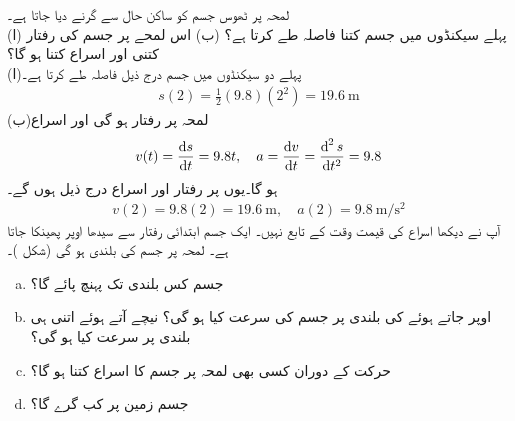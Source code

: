 لمحہ  پر  ٹھوس جسم کو ساکن حال سے گرنے دیا جاتا ہے۔\\
(ا) پہلے  سیکنڈوں میں جسم کتنا فاصلہ طے کرتا ہے؟ (ب) اس لمحے پر جسم کی رفتار  کتنی اور  اسراع کتنا ہو  گا؟\\
(ا)\quad پہلے دو سیکنڈوں میں جسم درج ذیل فاصلہ طے کرتا ہے۔
\begin{align*}
s(2)=\frac{1}{2}(9.8)(2^2)=\SI{19.6}{\meter}
\end{align*}
(ب)\quad لمحہ  پر رفتار  ہو گی  اور اسراع  
\begin{align*}
v(t)=\frac{\dif s}{\dif t}=9.8 t,\quad a=\frac{\dif v}{\dif t}=\frac{\dif^{\,2}s}{\dif t^2}=9.8
\end{align*}
ہو گا۔یوں  پر رفتار اور اسراع درج ذیل ہوں گے۔
\begin{align*}
v(2)=9.8(2)=\SI{19.6}{\meter},\quad a(2)=\SI{9.8}{\meter\per\second\squared}
\end{align*}
آپ نے دیکھا   اسراع  کی قیمت وقت  کے تابع نہیں۔
ایک جسم    ابتدائی رفتار سے سیدھا اوپر پھینکا جاتا ہے۔ لمحہ  پر جسم  کی بلندی   ہو گی (شکل )۔\\
\begin{enumerate}[a.]

\item
جسم کس بلندی تک پہنچ پائے گا؟
\item
اوپر جاتے ہوئے  کی بلندی پر جسم کی سرعت کیا ہو گی؟ نیچے آتے ہوئے اتنی ہی بلندی پر سرعت کیا ہو گی؟
\item
حرکت کے دوران کسی بھی لمحہ  پر جسم کا اسراع کتنا ہو گا؟ 
\item
جسم زمین پر کب گرے گا؟
\end{enumerate}
